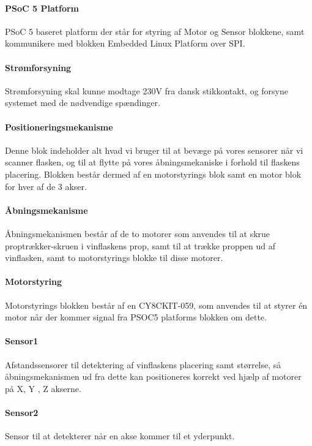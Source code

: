 \paragraph{PSoC 5 Platform} PSoC 5 baseret platform der står for styring af Motor og Sensor blokkene, samt kommunikere med blokken Embedded Linux Platform over SPI.

\paragraph{Strømforsyning} Strømforsyning skal kunne modtage 230V fra dansk stikkontakt, og forsyne systemet med de nødvendige spændinger.

\paragraph{Positioneringsmekanisme} Denne blok indeholder alt hvad vi bruger til at bevæge på vores sensorer når vi scanner flasken, og til at flytte på vores åbningsmekaniske i forhold til flaskens placering. Blokken består dermed af en motorstyrings blok samt en motor blok for hver af de 3 akser.

\paragraph{Åbningsmekanisme} Åbningsmekanismen består af de to motorer som anvendes til at skrue proptrækker-skruen i vinflaskens prop, samt til at trække proppen ud af vinflasken, samt to motorstyrings blokke til disse motorer.

\paragraph{Motorstyring} Motorstyrings blokken består af en CY8CKIT-059, som anvendes til at styrer én motor når der kommer signal fra PSOC5 platforms blokken om dette.

\paragraph{Sensor1} Afstandssensorer til detektering af vinflaskens placering samt størrelse, så åbningsmekanismen ud fra dette kan positioneres korrekt ved hjælp af motorer på X, Y , Z akserne.

\paragraph{Sensor2} Sensor til at detekterer når en akse kommer til et yderpunkt.

